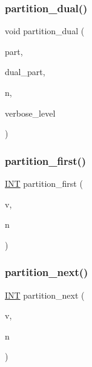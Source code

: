 \subsubsection{\texorpdfstring{partition\+\_\+dual()}{partition\_dual()}}
{\footnotesize\ttfamily void partition\+\_\+dual (\begin{DoxyParamCaption}\item[{\mbox{\hyperlink{galois_8h_a09fddde158a3a20bd2dcadb609de11dc}{I\+NT}} $\ast$}]{part,  }\item[{\mbox{\hyperlink{galois_8h_a09fddde158a3a20bd2dcadb609de11dc}{I\+NT}} $\ast$}]{dual\+\_\+part,  }\item[{\mbox{\hyperlink{galois_8h_a09fddde158a3a20bd2dcadb609de11dc}{I\+NT}}}]{n,  }\item[{\mbox{\hyperlink{galois_8h_a09fddde158a3a20bd2dcadb609de11dc}{I\+NT}}}]{verbose\+\_\+level }\end{DoxyParamCaption})}

\mbox{\label{combinatorics_8_c_a37cd07fbcf0bb8edf525895ff5342b4e}} 
\subsubsection{\texorpdfstring{partition\+\_\+first()}{partition\_first()}}
{\footnotesize\ttfamily \mbox{\hyperlink{galois_8h_a09fddde158a3a20bd2dcadb609de11dc}{I\+NT}} partition\+\_\+first (\begin{DoxyParamCaption}\item[{\mbox{\hyperlink{galois_8h_a09fddde158a3a20bd2dcadb609de11dc}{I\+NT}} $\ast$}]{v,  }\item[{\mbox{\hyperlink{galois_8h_a09fddde158a3a20bd2dcadb609de11dc}{I\+NT}}}]{n }\end{DoxyParamCaption})}

\mbox{\label{combinatorics_8_c_a17bc818e72947a68560bf8f2e151d7e7}} 
\subsubsection{\texorpdfstring{partition\+\_\+next()}{partition\_next()}}
{\footnotesize\ttfamily \mbox{\hyperlink{galois_8h_a09fddde158a3a20bd2dcadb609de11dc}{I\+NT}} partition\+\_\+next (\begin{DoxyParamCaption}\item[{\mbox{\hyperlink{galois_8h_a09fddde158a3a20bd2dcadb609de11dc}{I\+NT}} $\ast$}]{v,  }\item[{\mbox{\hyperlink{galois_8h_a09fddde158a3a20bd2dcadb609de11dc}{I\+NT}}}]{n }\end{DoxyParamCaption})}

